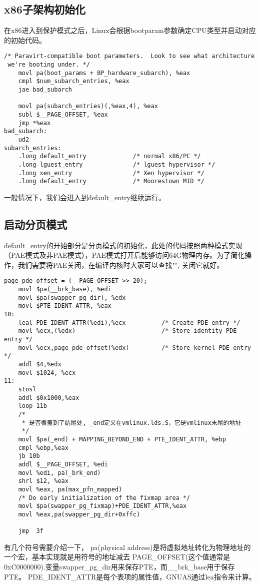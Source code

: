 \documentclass[b5paper,9pt,twoside,openany]{article}
\begin{document}
\subsection{x86子架构初始化}
在x86进入到保护模式之后，Linux会根据bootparam参数确定CPU类型并启动对应的初始代码。
\begin{lstlisting}
/* Paravirt-compatible boot parameters.  Look to see what architecture
 we're booting under. */
    movl pa(boot_params + BP_hardware_subarch), %eax
    cmpl $num_subarch_entries, %eax
    jae bad_subarch

    movl pa(subarch_entries)(,%eax,4), %eax
    subl $__PAGE_OFFSET, %eax
    jmp *%eax
bad_subarch:
    ud2
subarch_entries:
    .long default_entry             /* normal x86/PC */
    .long lguest_entry              /* lguest hypervisor */
    .long xen_entry                 /* Xen hypervisor */
    .long default_entry             /* Moorestown MID */
\end{lstlisting}
一般情况下，我们会进入到default\_entry继续运行。
\subsection{启动分页模式}
default\_entry的开始部分是分页模式的初始化，此处的代码按照两种模式实现（PAE模式及非PAE模式），PAE模式打开后能够访问64G物理内存。为了简化操作，我们需要将PAE关闭，在编译内核时大家可以查找"", 关闭它就好。
 
\lstset{language=[Motorola68k]Assembler, escapechar=@,style=gnuasmcode}
\begin{lstlisting}
page_pde_offset = (__PAGE_OFFSET >> 20);
    movl $pa(__brk_base), %edi
    movl $pa(swapper_pg_dir), %edx
    movl $PTE_IDENT_ATTR, %eax
10:
    leal PDE_IDENT_ATTR(%edi),%ecx          /* Create PDE entry */
    movl %ecx,(%edx)                        /* Store identity PDE entry */
    movl %ecx,page_pde_offset(%edx)         /* Store kernel PDE entry */
    addl $4,%edx
    movl $1024, %ecx
11:
    stosl
    addl $0x1000,%eax
    loop 11b
    /*
     * 是否覆盖到了结尾处, _end定义在vmlinux.lds.S，它是vmlinux末尾的地址
     */
    movl $pa(_end) + MAPPING_BEYOND_END + PTE_IDENT_ATTR, %ebp
    cmpl %ebp,%eax
    jb 10b
    addl $__PAGE_OFFSET, %edi
    movl %edi, pa(_brk_end)
    shrl $12, %eax
    movl %eax, pa(max_pfn_mapped)
    /* Do early initialization of the fixmap area */
    movl $pa(swapper_pg_fixmap)+PDE_IDENT_ATTR,%eax
    movl %eax,pa(swapper_pg_dir+0xffc)

    jmp  3f
\end{lstlisting}
有几个符号需要介绍一下， pa(physical address)是将虚拟地址转化为物理地址的一个宏，基本实现就是用符号的地址减去 PAGE\_OFFSET(这个值通常是0xC0000000).变量swapper\_pg\_dir用来保存PTE，而\_\_brk\_base用于保存PTE。
PDE\_IDENT\_ATTR是每个表项的属性值，GNUAS通过lea指令来计算。
\end{document}
